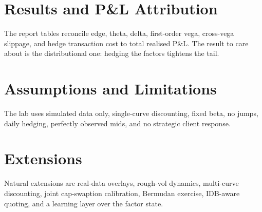 \documentclass[11pt]{article}
\begin{document}
\section{Results and P\&L Attribution}
The report tables reconcile edge, theta, delta, first-order vega, cross-vega
slippage, and hedge transaction cost to total realised P\&L.  The result to care
about is the distributional one: hedging the factors tightens the tail.

\section{Assumptions and Limitations}
The lab uses simulated data only, single-curve discounting, fixed beta, no
jumps, daily hedging, perfectly observed mids, and no strategic client response.

\section{Extensions}
Natural extensions are real-data overlays, rough-vol dynamics, multi-curve
discounting, joint cap-swaption calibration, Bermudan exercise, IDB-aware
quoting, and a learning layer over the factor state.

\printbibliography
\end{document}
